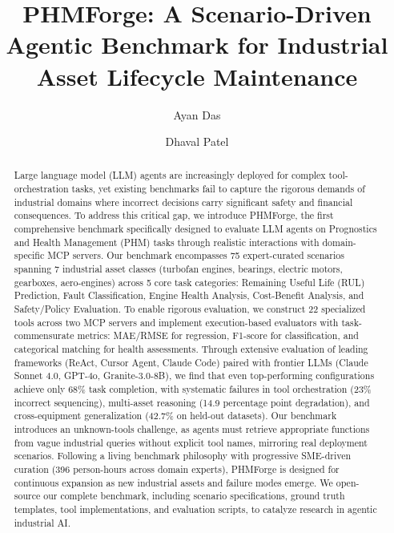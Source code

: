 \documentclass[sigconf, screen, nonacm]{acmart}
\begin{document}
\title{PHMForge: A Scenario-Driven Agentic Benchmark for Industrial Asset Lifecycle Maintenance}

\author{Ayan Das}

\author{Dhaval Patel}
\renewcommand{\shortauthors}{Das et al.}

\begin{abstract}
Large language model (LLM) agents are increasingly deployed for complex tool-orchestration tasks, yet existing benchmarks fail to capture the rigorous demands of industrial domains where incorrect decisions carry significant safety and financial consequences. To address this critical gap, we introduce PHMForge, the first comprehensive benchmark specifically designed to evaluate LLM agents on Prognostics and Health Management (PHM) tasks through realistic interactions with domain-specific MCP servers. Our benchmark encompasses 75 expert-curated scenarios spanning 7 industrial asset classes (turbofan engines, bearings, electric motors, gearboxes, aero-engines) across 5 core task categories: Remaining Useful Life (RUL) Prediction, Fault Classification, Engine Health Analysis, Cost-Benefit Analysis, and Safety/Policy Evaluation. To enable rigorous evaluation, we construct 22 specialized tools across two MCP servers and implement execution-based evaluators with task-commensurate metrics: MAE/RMSE for regression, F1-score for classification, and categorical matching for health assessments. Through extensive evaluation of leading frameworks (ReAct, Cursor Agent, Claude Code) paired with frontier LLMs (Claude Sonnet 4.0, GPT-4o, Granite-3.0-8B), we find that even top-performing configurations achieve only 68\% task completion, with systematic failures in tool orchestration (23\% incorrect sequencing), multi-asset reasoning (14.9 percentage point degradation), and cross-equipment generalization (42.7\% on held-out datasets). Our benchmark introduces an unknown-tools challenge, as agents must retrieve appropriate functions from vague industrial queries without explicit tool names, mirroring real deployment scenarios. Following a living benchmark philosophy with progressive SME-driven curation (396 person-hours across domain experts), PHMForge is designed for continuous expansion as new industrial assets and failure modes emerge. We open-source our complete benchmark, including scenario specifications, ground truth templates, tool implementations, and evaluation scripts, to catalyze research in agentic industrial AI.
\end{abstract}
\end{document}

